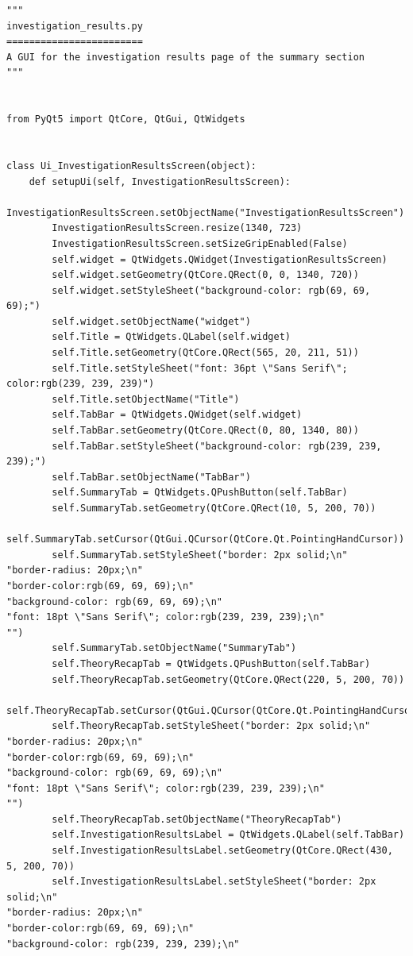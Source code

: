 \documentclass{article}
\begin{document}
\begin{lstlisting}
"""
investigation_results.py
========================
A GUI for the investigation results page of the summary section
"""


from PyQt5 import QtCore, QtGui, QtWidgets


class Ui_InvestigationResultsScreen(object):
    def setupUi(self, InvestigationResultsScreen):
        InvestigationResultsScreen.setObjectName("InvestigationResultsScreen")
        InvestigationResultsScreen.resize(1340, 723)
        InvestigationResultsScreen.setSizeGripEnabled(False)
        self.widget = QtWidgets.QWidget(InvestigationResultsScreen)
        self.widget.setGeometry(QtCore.QRect(0, 0, 1340, 720))
        self.widget.setStyleSheet("background-color: rgb(69, 69, 69);")
        self.widget.setObjectName("widget")
        self.Title = QtWidgets.QLabel(self.widget)
        self.Title.setGeometry(QtCore.QRect(565, 20, 211, 51))
        self.Title.setStyleSheet("font: 36pt \"Sans Serif\"; color:rgb(239, 239, 239)")
        self.Title.setObjectName("Title")
        self.TabBar = QtWidgets.QWidget(self.widget)
        self.TabBar.setGeometry(QtCore.QRect(0, 80, 1340, 80))
        self.TabBar.setStyleSheet("background-color: rgb(239, 239, 239);")
        self.TabBar.setObjectName("TabBar")
        self.SummaryTab = QtWidgets.QPushButton(self.TabBar)
        self.SummaryTab.setGeometry(QtCore.QRect(10, 5, 200, 70))
        self.SummaryTab.setCursor(QtGui.QCursor(QtCore.Qt.PointingHandCursor))
        self.SummaryTab.setStyleSheet("border: 2px solid;\n"
"border-radius: 20px;\n"
"border-color:rgb(69, 69, 69);\n"
"background-color: rgb(69, 69, 69);\n"
"font: 18pt \"Sans Serif\"; color:rgb(239, 239, 239);\n"
"")
        self.SummaryTab.setObjectName("SummaryTab")
        self.TheoryRecapTab = QtWidgets.QPushButton(self.TabBar)
        self.TheoryRecapTab.setGeometry(QtCore.QRect(220, 5, 200, 70))
        self.TheoryRecapTab.setCursor(QtGui.QCursor(QtCore.Qt.PointingHandCursor))
        self.TheoryRecapTab.setStyleSheet("border: 2px solid;\n"
"border-radius: 20px;\n"
"border-color:rgb(69, 69, 69);\n"
"background-color: rgb(69, 69, 69);\n"
"font: 18pt \"Sans Serif\"; color:rgb(239, 239, 239);\n"
"")
        self.TheoryRecapTab.setObjectName("TheoryRecapTab")
        self.InvestigationResultsLabel = QtWidgets.QLabel(self.TabBar)
        self.InvestigationResultsLabel.setGeometry(QtCore.QRect(430, 5, 200, 70))
        self.InvestigationResultsLabel.setStyleSheet("border: 2px solid;\n"
"border-radius: 20px;\n"
"border-color:rgb(69, 69, 69);\n"
"background-color: rgb(239, 239, 239);\n"

\end{lstlisting}
\end{document}
